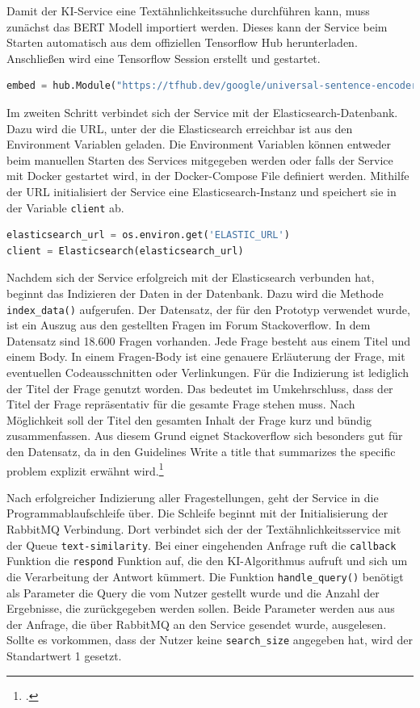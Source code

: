 Damit der KI-Service eine Textähnlichkeitssuche durchführen kann, muss zunächst das BERT Modell importiert werden. Dieses kann der Service beim Starten automatisch aus dem offiziellen Tensorflow Hub herunterladen. Anschließen wird eine Tensorflow Session erstellt und gestartet. 

\begin{lstlisting}[language=Python, caption={Laden des BERT-Modells}]
embed = hub.Module("https://tfhub.dev/google/universal-sentence-encoder/2")
\end{lstlisting}

Im zweiten Schritt verbindet sich der Service mit der Elasticsearch-Datenbank. Dazu wird die URL, unter der die Elasticsearch erreichbar ist aus den Environment Variablen geladen. Die Environment Variablen können entweder beim manuellen Starten des Services mitgegeben werden oder falls der Service mit Docker gestartet wird, in der Docker-Compose File definiert werden. Mithilfe der URL initialisiert der Service eine Elasticsearch-Instanz und speichert sie in der Variable \texttt{client} ab. 

\begin{lstlisting}[language=Python, caption={Starten der Elasticsearch-Instanz}]
elasticsearch_url = os.environ.get('ELASTIC_URL')
client = Elasticsearch(elasticsearch_url)
\end{lstlisting}

Nachdem sich der Service erfolgreich mit der Elasticsearch verbunden hat, beginnt das Indizieren der Daten in der Datenbank. Dazu wird die Methode \texttt{index\_{}data()} aufgerufen. Der Datensatz, der für den Prototyp verwendet wurde, ist ein Auszug aus den gestellten Fragen im Forum Stackoverflow. In dem Datensatz sind 18.600 Fragen vorhanden. Jede Frage besteht aus einem Titel und einem Body. In einem Fragen-Body ist eine genauere Erläuterung der Frage, mit eventuellen Codeausschnitten oder Verlinkungen. Für die Indizierung ist lediglich der Titel der Frage genutzt worden. Das bedeutet im Umkehrschluss, dass der Titel der Frage repräsentativ für die gesamte Frage stehen muss. Nach Möglichkeit soll der Titel den gesamten Inhalt der Frage kurz und bündig zusammenfassen. Aus diesem Grund eignet  Stackoverflow sich besonders gut für den Datensatz, da in den Guidelines \glqq Write a title that summarizes the specific problem\grqq{} explizit erwähnt wird.\footcite{stackoverflow2022question}

Nach erfolgreicher Indizierung aller Fragestellungen, geht der Service in die Programmablaufschleife über. Die Schleife beginnt mit der Initialisierung der RabbitMQ Verbindung. Dort verbindet sich der der Textähnlichkeitsservice mit der Queue \texttt{text-similarity}. Bei einer eingehenden Anfrage ruft die \texttt{callback} Funktion die \texttt{respond} Funktion auf, die den KI-Algorithmus aufruft und sich um die Verarbeitung der Antwort kümmert. Die Funktion \texttt{handle\_{}query()} benötigt als Parameter die Query die vom Nutzer gestellt wurde und die Anzahl der Ergebnisse, die zurückgegeben werden sollen. Beide Parameter werden aus aus der Anfrage, die über RabbitMQ an den Service gesendet wurde, ausgelesen. Sollte es vorkommen, dass der Nutzer keine \texttt{search\_{}size} angegeben hat, wird der Standartwert 1 gesetzt.
 
